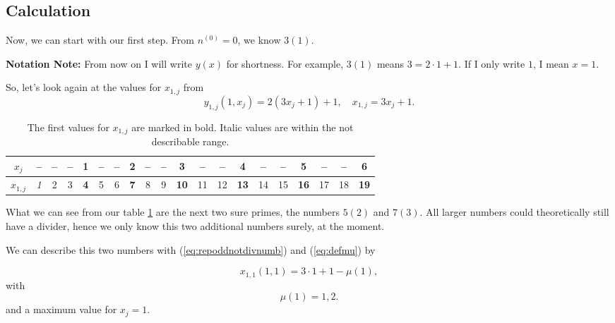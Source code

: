 \subsection{Calculation}
\label{ss:calcualtionstepn0_1}
Now, we can start with our first step. From $n^{\left(0\right)} = 0$, we know $3(1)$.

\vspace{0.3cm}
\textbf{Notation Note:} From now on I will write $y\left(x\right)$ for shortness. For example, $3(1)$ means $3 = 2\cdot 1 + 1$. If I only write $1$, I mean $x = 1$.

\vspace{0.3cm}
So, let's look again at the values for $x_{1,j}$ from 
\begin{equation}
	y_{1,j}\left(1,x_{j}\right) = 2\left(3x_{j} + 1\right) + 1, \quad x_{1,j} = 3x_{j} + 1.
\label{eq:stepn0_1_valuesfordiv3}
\end{equation}

\begin{table}[H]
\centering
\caption{The first values for $x_{1,j}$ are marked in bold. Italic values are within the not describable range.}
\begin{tabular}{c|ccccccccccccccccccc}
	$x_{j}$ & -- & -- & -- & 1 & -- & -- & 2 & --  & -- & 3 & -- & -- & 4 & -- & -- & 5 & -- & -- & 6 \\
\hline	$x_{1,j}$ & \textit{1} & 2 & 3 & \textbf{4} & 5 & 6 & \textbf{7} & 8 & 9 & \textbf{10} & 11 & 12 & \textbf{13} & 14 & 15 & \textbf{16} & 17 & 18 & \textbf{19}
\end{tabular}
\label{tab:stepn0_1_valuesfordiv3}
\end{table}

What we can see from our table \ref{tab:stepn0_1_valuesfordiv3} are the next two sure primes, the numbers $5(2)$ and $7(3)$. All larger numbers could theoretically still have a divider, hence we only know this two additional numbers surely, at the moment.

\vspace{0.3cm}
We can describe this two numbers with (\ref{eq:repoddnotdivnumb}) and (\ref{eq:defmu}) by

\begin{equation}
	x_{1,1}\left(1,1\right) = 3\cdot 1 + 1 - \mu\left(1\right),
\label{eq:stepn0_1_eqfordiv3res}
\end{equation}
with
\begin{equation}
	\mu\left(1\right) = 1,2.
\label{eq:stepn0_1_eqfordiv3res}
\end{equation}
and a maximum value for $x_{j} = 1$.
